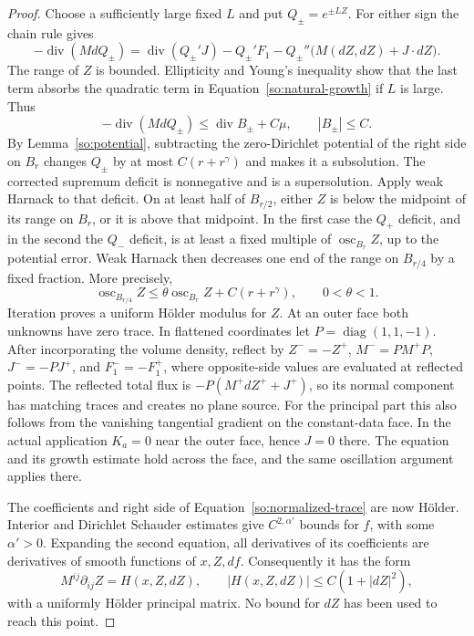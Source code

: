 \begin{proof}
Choose a sufficiently large fixed $L$ and put $Q_\pm=e^{\pm LZ}$.
For either sign the chain rule gives
\[
 -\operatorname{div}(M dQ_\pm)
 =\operatorname{div}(Q_\pm'J)-Q_\pm'F_1
       -Q_\pm''\bigl(M(dZ,dZ)+J\cdot dZ\bigr).
\]
The range of $Z$ is bounded.  Ellipticity and Young's inequality show
that the last term absorbs the quadratic term in
Equation~\ref{so:natural-growth} if $L$ is large.  Thus
\begin{equation}\label{so:exponential-subsolutions}
 -\operatorname{div}(M dQ_\pm)
       \le\operatorname{div}B_\pm+C\mu,\qquad |B_\pm|\le C.
\end{equation}
By Lemma~\ref{so:potential}, subtracting the zero-Dirichlet potential
of the right side on $B_r$ changes $Q_\pm$ by at most
$C(r+r^\gamma)$ and makes it a subsolution.  The corrected supremum
deficit is nonnegative and is a supersolution.  Apply weak Harnack to
that deficit.  On at least half of $B_{r/2}$, either $Z$ is below the
midpoint of its range on $B_r$, or it is above that midpoint.  In the
first case the $Q_+$ deficit, and in the second the $Q_-$ deficit, is
at least a fixed multiple of $\operatorname{osc}_{B_r}Z$, up to the
potential error.  Weak Harnack then decreases one end of the range on
$B_{r/4}$ by a fixed fraction.  More precisely,
\[
 \operatorname{osc}_{B_{r/4}}Z
 \le\theta\operatorname{osc}_{B_r}Z+C(r+r^\gamma),
 \qquad 0<\theta<1.
\]
Iteration proves a uniform H\"older modulus for $Z$.
At an outer face both unknowns have zero trace.  In flattened
coordinates let $P=\operatorname{diag}(1,1,-1)$.  After incorporating
the volume density, reflect by
$Z^-=-Z^+$, $M^-=PM^+P$, $J^-=-PJ^+$, and $F_1^-=-F_1^+$,
where opposite-side values are evaluated at reflected points.
The reflected total flux is $-P(M^+dZ^++J^+)$, so its normal component
has matching traces and creates no plane source.  For the principal
part this also follows from the vanishing tangential gradient on the
constant-data face.  In the actual application $K_a=0$ near the outer
face, hence $J=0$ there.  The equation and its growth estimate hold
across the face, and the same oscillation argument applies there.

The coefficients and right side of Equation~\ref{so:normalized-trace}
are now H\"older.  Interior and Dirichlet Schauder estimates give
$C^{2,\alpha'}$ bounds for $f$, with some $\alpha'>0$.  Expanding the
second equation, all derivatives of its coefficients are derivatives
of smooth functions of $x,Z,df$.  Consequently it has the form
\begin{equation}\label{so:Z-nondivergence}
 M^{ij}\partial_{ij}Z=H(x,Z,dZ),\qquad
 |H(x,Z,dZ)|\le C(1+|dZ|^2),
\end{equation}
with a uniformly H\"older principal matrix.  No bound for $dZ$ has
been used to reach this point.


\end{proof}
